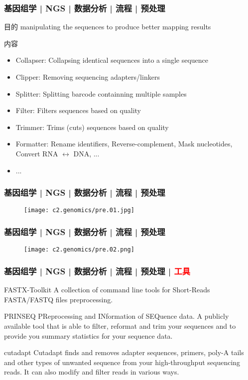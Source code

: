 \begin{frame}
  \frametitle{基因组学 | NGS | 数据分析 | 流程 | 预处理}
  \begin{block}{目的}
 manipulating the sequences to produce better mapping results
  \end{block}
  \pause
  \begin{block}{内容}
    \begin{itemize}
      \item Collapser: Collapsing identical sequences into a single sequence
      \item Clipper: Removing sequencing adapters/linkers
      \item Splitter: Splitting barcode containning multiple samples
      \item Filter: Filters sequences based on quality
      \item Trimmer: Trims (cuts) sequences based on quality
      \item Formatter: Rename identifiers, Reverse-complement, Mask nucleotides, Convert RNA $\leftrightarrow$ DNA, ...
      \item ...
    \end{itemize}
  \end{block}
\end{frame}

\begin{frame}
  \frametitle{基因组学 | NGS | 数据分析 | 流程 | 预处理}
  \begin{figure}
    \centering
    \texttt{[image: c2.genomics/pre.01.jpg]}
  \end{figure}
\end{frame}

\begin{frame}
  \frametitle{基因组学 | NGS | 数据分析 | 流程 | 预处理}
  \begin{figure}
    \centering
    \texttt{[image: c2.genomics/pre.02.png]}
  \end{figure}
\end{frame}

\begin{frame}
  \frametitle{基因组学 | NGS | 数据分析 | 流程 | 预处理 | \textcolor{red}{工具}}
  \begin{block}{FASTX-Toolkit}
    A collection of command line tools for Short-Reads FASTA/FASTQ files preprocessing.
  \end{block}
  \pause
  \begin{block}{PRINSEQ}
    PReprocessing and INformation of SEQuence data. A publicly available tool that is able to filter, reformat and trim your sequences and to provide you summary statistics for your sequence data.
  \end{block}
  \pause
  \begin{block}{cutadapt}
    Cutadapt finds and removes adapter sequences, primers, poly-A tails and other types of unwanted sequence from your high-throughput sequencing reads. It can also modify and filter reads in various ways.
  \end{block}
\end{frame}

